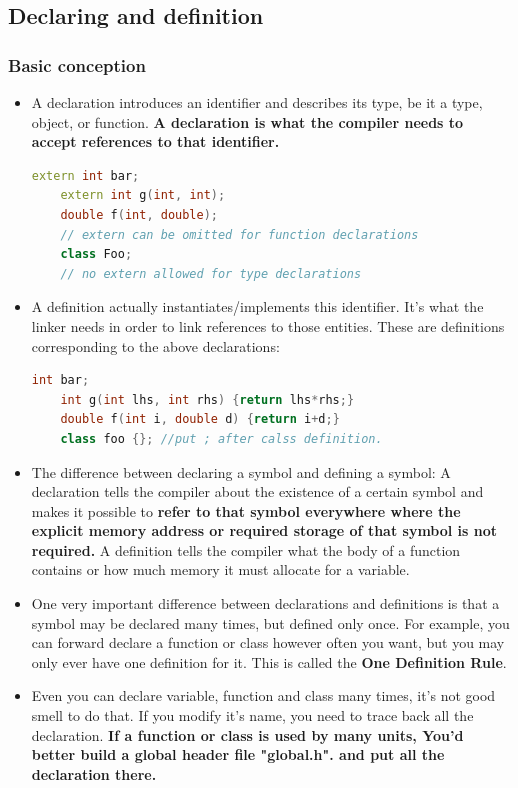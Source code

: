 \documentclass[a4paper,12pt,twoside]{book}
\begin{document}
\subsection{Declaring and definition}
\subsubsection{Basic conception}
\begin{itemize}
    \item A declaration introduces an identifier and describes its type, be it a type, object, or function. \textbf{A declaration is what the compiler needs to accept references to that identifier.} 
    
    \begin{lstlisting}[frame=single, language=c++]
    extern int bar;
    extern int g(int, int);
    double f(int, double); 
    // extern can be omitted for function declarations
    class Foo; 
    // no extern allowed for type declarations
    \end{lstlisting}
    
    \item A definition actually instantiates/implements this identifier. It's what the linker needs in order to link references to those entities. These are definitions corresponding to the above declarations:
    \begin{lstlisting}[frame=single, language=c++]
    int bar;
    int g(int lhs, int rhs) {return lhs*rhs;}
    double f(int i, double d) {return i+d;}
    class foo {}; //put ; after calss definition.
    \end{lstlisting}
    
    \item The difference between declaring a symbol and defining a symbol: A declaration tells the compiler about the existence of a certain symbol and makes it possible to \textbf{refer to that symbol everywhere where the explicit memory address or required storage of that symbol is not required.}  A definition tells the compiler what the body of a function contains or how much memory it must allocate for a variable.
    
    \item One very important difference between declarations and definitions is that a symbol may be declared many times, but defined only once. For example, you can forward declare a function or class however often you want, but you may only ever have one definition for it. This is called the \textbf{One Definition Rule}.
    
    \item Even you can declare variable, function and class many times, it's not good smell to do that.  If you modify it's name, you need to trace back all the declaration. \textbf{If a function or class is used by many units, You'd better build a global header file "global.h". and put all the declaration there.} 
\end{itemize}
\end{document}
